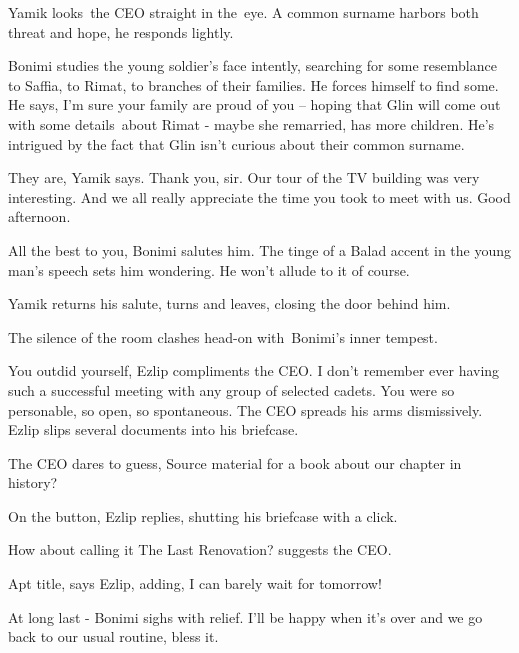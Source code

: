 \documentclass[letterpaper]{article}
\begin{document}
Yamik looks~the CEO straight in the~eye. {\textquotedbl}A common surname harbors both threat and hope,{\textquotedbl} he
responds lightly.

Bonimi studies the young soldier's face intently, searching for some resemblance to Saffia, to Rimat, to branches of
their families. He forces himself to find some. He says, {\textquotedbl}I'm sure your family{ }are proud
of you --{\textquotedbl} hoping that Glin will come out with some details~about Rimat - maybe she remarried, has more
children. He's intrigued by the fact that Glin isn't curious about their common surname.

{\textquotedbl}They are,{\textquotedbl} Yamik says. {\textquotedbl}Thank you, sir. Our tour of the TV building was very
interesting. And we all really appreciate the time you took to meet with us. Good afternoon.{\textquotedbl} 

{\textquotedbl}All the best to you,{\textquotedbl} Bonimi salutes him. The tinge of a Balad accent in the young man's
speech sets him wondering. He won't allude to it of course. 

Yamik returns his salute, turns and leaves, closing the door behind him.

The silence of the room clashes head-on with~Bonimi's inner tempest.

{\textquotedbl}You outdid yourself,{\textquotedbl} Ezlip compliments the CEO. {\textquotedbl}I don't remember ever
having such a successful meeting with any group of selected cadets. You were so personable, so open, so
spontaneous.{\textquotedbl} The CEO spreads his arms dismissively. Ezlip slips several documents into his
briefcase.\textbf{ }

The CEO dares to guess, {\textquotedbl}Source material for a book about our chapter in history?{\textquotedbl} 

{\textquotedbl}On the button,{\textquotedbl} Ezlip replies, shutting his briefcase with a click. 

{\textquotedbl}How about calling it The Last Renovation?{\textquotedbl} suggests the CEO. 

{\textquotedbl}Apt title,{\textquotedbl} says Ezlip, adding, {\textquotedbl}I can barely wait for
tomorrow!{\textquotedbl}

{\textquotedbl}At long last -{\textquotedbl} Bonimi sighs with relief. {\textquotedbl}I'll be happy when it's over and
we go back to our usual routine, bless it.{\textquotedbl}


\bigskip
\end{document}
